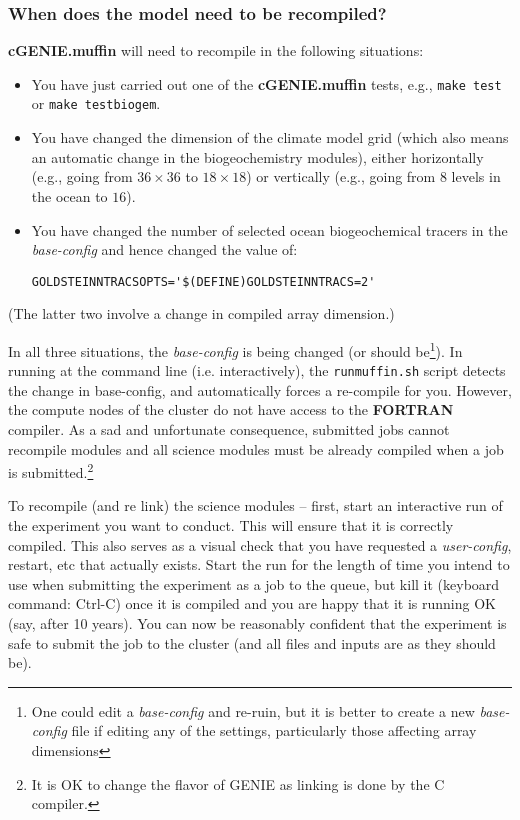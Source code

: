 \documentclass[11pt,fleqn]{book} %
\begin{document}
%
\subsubsection{When does the model need to be recompiled?}

\textbf{cGENIE.muffin} will need to recompile in the following situations:

\begin{itemize}

\vspace{1mm}
\item You have just carried out one of the \textbf{cGENIE.muffin} tests, e.g., \texttt{make test} or \texttt{make testbiogem}.
\item You have changed the dimension of the climate model grid (which also means an automatic change in the biogeochemistry modules), either horizontally (e.g., going from \(36\times 36\) to \(18\times 18\)) or vertically (e.g., going from \(8\) levels in the ocean to \(16\)).
\item You have changed the number of selected ocean biogeochemical tracers in the \textit{base-config} and hence changed the value of:
\small\begin{verbatim}
GOLDSTEINNTRACSOPTS='$(DEFINE)GOLDSTEINNTRACS=2'
\end{verbatim}\normalsize

\end{itemize}
(The latter two involve a change in compiled array dimension.)

In all three situations, the \textit{base-config }is being changed (or should be\footnote{One could edit a \textit{base-config} and re-ruin, but it is better to create a new \textit{base-config }file if editing any of the settings, particularly those affecting array dimensions}). In running at the command line (i.e. interactively), the \texttt{\footnotesize runmuffin.sh} script detects the change in base-config, and automatically forces a re-compile for you. However, the compute nodes of the cluster do not have access to the \textbf{FORTRAN} compiler. As a sad and unfortunate consequence, submitted jobs cannot recompile modules and all science modules must be already compiled when a job is submitted.\footnote{It is OK to change the flavor of GENIE as linking is done by the C compiler.}

To  recompile (and re link) the science modules -- first, start an interactive run of the experiment you want to conduct. This will ensure that it is correctly compiled. This also serves as a visual check that you have requested a \textit{user-config}, restart, etc that actually exists. Start the run for the length of time you intend to use when submitting the experiment as a job to the queue, but kill it (keyboard command: \textsf{\footnotesize Ctrl-C}) once it is compiled and you are happy that it is running OK (say, after 10 years).
\noindent You can now be reasonably confident that the experiment is safe to submit the job to the cluster (and all files and inputs are as they should be).
\end{document}
